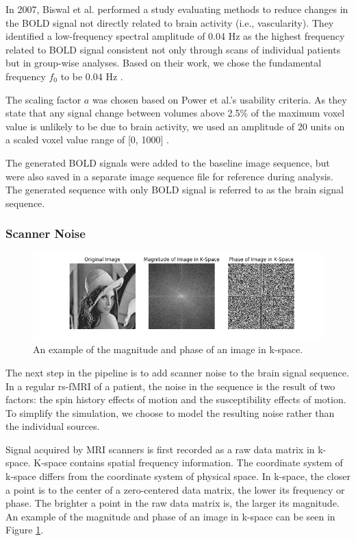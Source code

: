 In 2007, Biswal et al. performed a study evaluating methods to reduce changes in the BOLD signal not directly related to brain activity (i.e., vascularity). They identified a low-frequency spectral amplitude of 0.04 Hz as the highest frequency related to BOLD signal consistent not only through scans of individual patients but in group-wise analyses. Based on their work, we chose the fundamental frequency $f_0$ to be 0.04 Hz \cite{Biswal2007}. 

The scaling factor $a$ was chosen based on Power et al.'s usability criteria. As they state that any signal change between volumes above 2.5\% of the maximum voxel value is unlikely to be due to brain activity, we used an amplitude of 20 units on a scaled voxel value range of [0, 1000] \cite{Power2012}. 

The generated BOLD signals were added to the baseline image sequence, but were also saved in a separate image sequence file for reference during analysis. The generated sequence with only BOLD signal is referred to as the brain signal sequence.

\subsubsection{Scanner Noise}

\begin{figure}
\centering
\includegraphics[width=.9\textwidth]{5/fft_example.png}
\caption{An example of the magnitude and phase of an image in k-space.}
\label{ch5:fft_example}
\end{figure}

The next step in the pipeline is to add scanner noise to the brain signal sequence. In a regular rs-fMRI of a patient, the noise in the sequence is the result of two factors: the spin history effects of motion and the susceptibility effects of motion. To simplify the simulation, we choose to model the resulting noise rather than the individual sources.

Signal acquired by MRI scanners is first recorded as a raw data matrix in k-space. K-space contains spatial frequency information. The coordinate system of k-space differs from the coordinate system of physical space. In k-space, the closer a point is to the center of a zero-centered data matrix, the lower its frequency or phase. The brighter a point in the raw data matrix is, the larger its magnitude. An example of the magnitude and phase of an image in k-space can be seen in Figure \ref{ch5:fft_example}.

